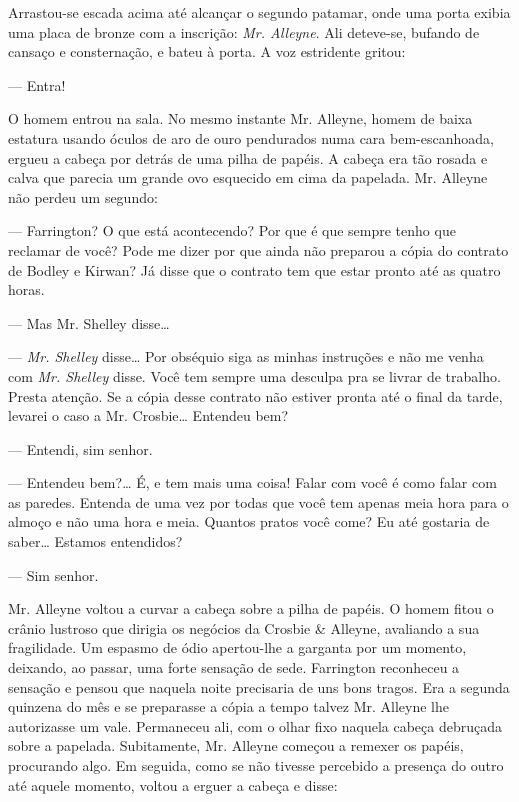 Arrastou-se escada acima até alcançar o segundo patamar, onde uma
porta exibia uma placa de bronze com a inscrição: \textit{Mr. Alleyne}. Ali
deteve-se, bufando de cansaço e consternação, e bateu à porta. A voz
estridente gritou:

--- Entra!

O homem entrou na sala. No mesmo instante Mr. Alleyne, homem de
baixa estatura usando óculos de aro de ouro
pendurados numa cara bem-escanhoada, ergueu a cabeça por detrás de uma pilha
de papéis. A cabeça era tão rosada e calva que parecia um grande ovo
esquecido em cima da papelada. Mr. Alleyne não perdeu um segundo:

--- Farrington? O que está acontecendo? Por que é que sempre tenho que
reclamar de você? Pode me dizer por que ainda não preparou a cópia do
contrato de Bodley e Kirwan? Já disse que o contrato tem que estar
pronto até as quatro horas.

--- Mas Mr. Shelley disse\ldots{}

--- \textit{Mr. Shelley} disse\ldots{} Por obséquio siga as minhas instruções e não
me venha com \textit{Mr. Shelley} disse. Você tem sempre uma desculpa pra se
livrar de trabalho. Presta atenção. Se a cópia desse contrato não
estiver pronta até o final da tarde, levarei o caso a Mr. Crosbie\ldots{}
Entendeu bem?

--- Entendi, sim senhor.

--- Entendeu bem?\ldots{} É, e tem mais uma coisa! Falar com você é como
falar com as paredes. Entenda de uma vez por todas que você tem apenas
meia hora para o almoço e não uma hora e meia. Quantos pratos você
come? Eu até gostaria de saber\ldots{} Estamos entendidos?

--- Sim senhor.

Mr. Alleyne voltou a curvar a cabeça sobre a pilha de papéis. O homem
fitou o crânio lustroso que dirigia os negócios da Crosbie \& Alleyne,
avaliando a sua fragilidade. Um espasmo de ódio apertou-lhe a garganta
por um momento, deixando, ao passar, uma forte sensação de sede.
Farrington reconheceu a sensação e pensou que naquela noite precisaria
de uns bons tragos. Era a segunda quinzena do mês e se preparasse a
cópia a tempo talvez Mr. Alleyne lhe autorizasse um vale. Permaneceu
ali, com o olhar fixo naquela cabeça debruçada sobre a papelada.
Subitamente, Mr. Alleyne começou a remexer os papéis, procurando algo.
Em seguida, como se não tivesse percebido a presença do outro até
aquele momento, voltou a erguer a cabeça e disse:

